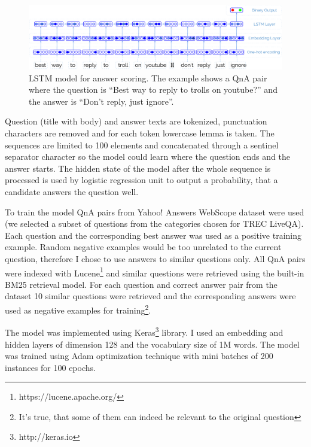 \begin{figure}
	\includegraphics[width=\textwidth]{img/liveqa_qa_lstm}
	\caption{LSTM model for answer scoring. The example shows a QnA pair where the question is ``Best way to reply to trolls on youtube?'' and the answer is ``Don't reply, just ignore''.}
	\label{figure:non-factoid:liveqa:lstm_model}
\end{figure}

Question (title with body) and answer texts are tokenized, punctuation characters are removed and for each token lowercase lemma is taken.
The sequences are limited to 100 elements and concatenated through a sentinel separator character so the model could learn where the question ends and the answer starts.
The hidden state of the model after the whole sequence is processed is used by logistic regression unit to output a probability, that a candidate answers the question well.

To train the model QnA pairs from Yahoo! Answers WebScope dataset were used (we selected a subset of questions from the categories chosen for TREC LiveQA).
Each question and the corresponding best answer was used as a positive training example.
Random negative examples would be too unrelated to the current question, therefore I chose to use answers to similar questions only.
All QnA pairs were indexed with Lucene\footnote{https://lucene.apache.org/} and similar questions were retrieved using the built-in BM25 retrieval model.
For each question and correct answer pair from the dataset 10 similar questions were retrieved and the corresponding answers were used as negative examples for training\footnote{It's true, that some of them can indeed be relevant to the original question}.

The model was implemented using Keras\footnote{http://keras.io} library.
I used an embedding and hidden layers of dimension 128 and the vocabulary size of 1M words.
The model was trained using Adam optimization technique \cite{kingma2014adam} with mini batches of 200 instances for 100 epochs.

